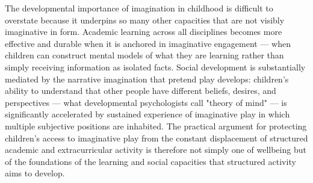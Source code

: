 The developmental importance of imagination in childhood is difficult to overstate because it underpins so many other capacities that are not visibly imaginative in form. Academic learning across all disciplines becomes more effective and durable when it is anchored in imaginative engagement — when children can construct mental models of what they are learning rather than simply receiving information as isolated facts. Social development is substantially mediated by the narrative imagination that pretend play develops: children's ability to understand that other people have different beliefs, desires, and perspectives — what developmental psychologists call "theory of mind" — is significantly accelerated by sustained experience of imaginative play in which multiple subjective positions are inhabited. The practical argument for protecting children's access to imaginative play from the constant displacement of structured academic and extracurricular activity is therefore not simply one of wellbeing but of the foundations of the learning and social capacities that structured activity aims to develop.

\separator


